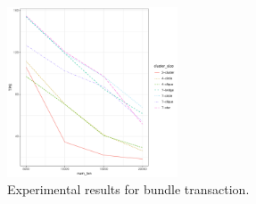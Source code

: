 \begin{figure}[!ht]
\begin{center}
\includegraphics[width=0.45\textwidth]{figures/multi_txn.pdf}
    \caption{
        Experimental results for bundle transaction.
     }
\label{multi_txn}
\end{center}
\end{figure}


